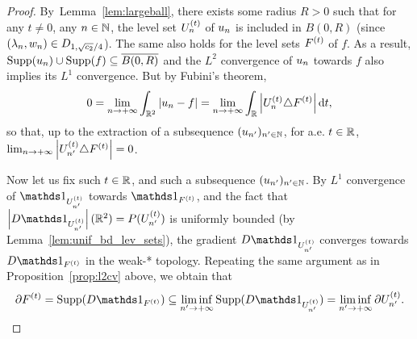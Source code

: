 \begin{proof}

By~Lemma~\ref{lem:largeball}, there exists some radius $R>0$ such that for any $t\neq 0$, any $n\in \mathbb{N}$, the level set $U_n^{(t)}$ of $u_{n}$ is included in $B(0,R)$ (since $(\lambda_n,w_n)\in D_{1,\sqrt{c_2}/4}$). The same also holds for the level sets $F^{(t)}$ of $f$.
As a result, $\operatorname{Supp}(u_{n})\cup \operatorname{Supp}(f)\subseteq \overline{B(0,R)}$ and the $L^2$ convergence of $u_{n}$ towards $f$ also implies its $L^1$ convergence. But by Fubini's theorem,
\begin{equation*}
  0=\lim_{n\to+\infty}  \int_{\mathbb{R}^2}\left| u_{n}-f \right|=\lim_{n\to+\infty} \int_{\mathbb{R}} \left| U_n^{(t)}\triangle F^{(t)} \right|\mathrm{d} t, 
\end{equation*}
so that, up to the extraction of a subsequence $(u_{n'})_{n'\in\mathbb{N}}$, for a.e. $t\in \mathbb{R}$, $\lim_{n\to+\infty}\left| U_{n'}^{(t)}\triangle F^{(t)} \right|=0$.

Now let us fix such $t\in \mathbb{R}$, and such a subsequence $(u_{n'})_{n'\in\mathbb{N}}$. By $L^1$ convergence of $\bun{\Unp{t}}$ towards $\bun{\F{t}}$, and the fact that $\abs{D\bun{\Unp{t}}}(\RR^2)=P(\Unp{t})$ is uniformly bounded (by Lemma~\eqref{lem:unif_bd_lev_sets}), the gradient $D\bun{\Unp{t}}$ converges towards $D\bun{\F{t}}$ in the weak-* topology. Repeating the same argument as in Proposition~\ref{prop:l2cv} above, we obtain that 
\begin{equation*}
  \partial \F{t}=\supp(D\bun{\F{t}}) \subseteq \liminf_{n'\to+\infty}\supp(D\bun{\Unp{t}}) =\liminf_{n'\to+\infty} \partial\Unp{t}.
\end{equation*}




\end{proof}
